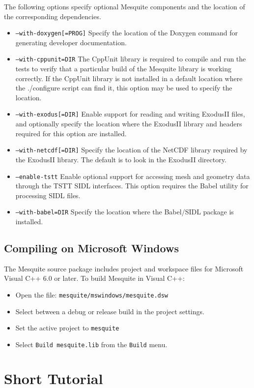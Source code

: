 The following options specify optional Mesquite components and the location 
of the corresponding dependencies.
\begin{itemize}
\item \texttt{--with-doxygen[=PROG]} Specify the location of the Doxygen
command for generating developer documentation.
\item \texttt{--with-cppunit=DIR}  The CppUnit library is required to compile
and run the tests to verify that a particular build of the Mesquite library
is working correctly.  If the CppUnit library is not installed in a default location
where the ./configure script can find it, this option may be used to specify
the location.
\item \texttt{--with-exodus[=DIR]}  Enable support for reading and writing
ExodusII files, and optionally specify the location where the ExodusII library
and headers required for this option are installed.
\item \texttt{--with-netcdf[=DIR]}  Specify the location of the NetCDF library
required by the ExodusII library.  The default is to look in the ExodusII
directory.
\item \texttt{--enable-tstt}  Enable optional support for accessing mesh
and geometry data through the TSTT SIDL interfaces.  This option requires
the Babel utility for processing SIDL files.
\item \texttt{--with-babel=DIR}  Specify the location where the Babel/SIDL
package is installed.
\end{itemize}

\subsection{Compiling on Microsoft Windows}
The Mesquite source package includes project and workspace files for Microsoft Visual C++ 6.0 or later.  To build Mesquite in Visual C++:
\begin{itemize}
\item Open the file: \texttt{mesquite/mswindows/mesquite.dsw}
\item Select between a debug or release build in the project settings.  
\item Set the active project to \texttt{mesquite}
\item Select \texttt{Build mesquite.lib} from the \texttt{Build} menu.
\end{itemize}

\section{Short Tutorial}

